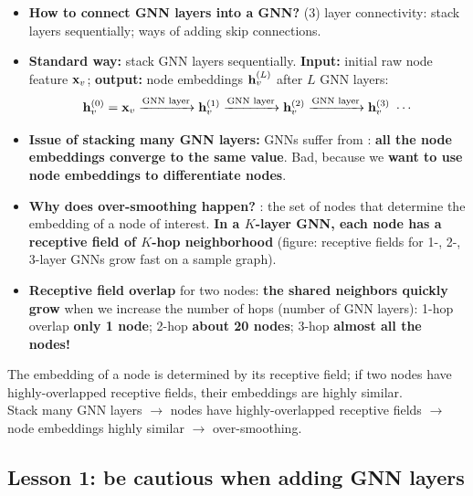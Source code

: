 \begin{itemize}
  \item \textbf{How to connect GNN layers into a GNN?} (3) layer connectivity:
    stack layers sequentially; ways of adding skip connections.
  \item \textbf{Standard way:} stack GNN layers sequentially. \textbf{Input:}
    initial raw node feature $\mathbf{x}_v$; \textbf{output:} node embeddings
    $\mathbf{h}_v^{(L)}$ after $L$ GNN layers:
    \[
      \mathbf{h}_v^{(0)}=\mathbf{x}_v \xrightarrow{\text{GNN layer}} \mathbf{h}_v^{(1)}
      \xrightarrow{\text{GNN layer}} \mathbf{h}_v^{(2)} \xrightarrow{\text{GNN layer}}
      \mathbf{h}_v^{(3)}\ \cdots
    \]
  \item \textbf{Issue of stacking many GNN layers:} GNNs suffer from
    : \textbf{all the node embeddings converge
    to the same value}. Bad, because we \textbf{want to use node embeddings to
    differentiate nodes}.
  \item \textbf{Why does over-smoothing happen?}
    : the set of nodes that determine the embedding of a
    node of interest. \textbf{In a $K$-layer GNN, each node has a receptive
    field of $K$-hop neighborhood} (figure: receptive fields for 1-, 2-, 3-layer
    GNNs grow fast on a sample graph).
  \item \textbf{Receptive field overlap} for two nodes: \textbf{the shared
    neighbors quickly grow} when we increase the number of hops (number of GNN
    layers): 1-hop overlap \textbf{only 1 node}; 2-hop \textbf{about 20 nodes};
    3-hop \textbf{almost all the nodes!}
\end{itemize}
\begin{keyidea}
  The embedding of a node is determined by its receptive field; if two nodes have
  highly-overlapped receptive fields, their embeddings are highly similar.\\
  Stack many GNN layers $\to$ nodes have highly-overlapped receptive fields
  $\to$ node embeddings highly similar $\to$ over-smoothing.
\end{keyidea}

\subsection{Lesson 1: be cautious when adding GNN layers}\label{sec:lec04-lesson1}

